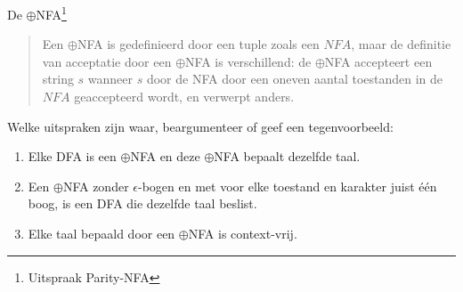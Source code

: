 \documentclass{article}
\begin{document}
\begin{question}[] De $\oplus$NFA\footnote{Uitspraak Parity-NFA}
\vspace{-0.5cm}
\begin{quote}
\begin{definition}
Een $\oplus$NFA is gedefinieerd door een tuple zoals een $NFA$, maar de
definitie van acceptatie door een $\oplus$NFA is verschillend: de
$\oplus$NFA accepteert een string $s$ wanneer $s$ door de NFA door een
oneven aantal toestanden in de $NFA$ geaccepteerd wordt, en verwerpt
anders.
\end{definition}
\end{quote}
Welke uitspraken zijn waar, beargumenteer of geef een tegenvoorbeeld:
\begin{enumerate}
\item
Elke DFA is een $\oplus$NFA en deze $\oplus$NFA bepaalt dezelfde taal.

\item
Een $\oplus$NFA zonder $\epsilon$-bogen en met voor elke toestand en
karakter juist \'{e}\'{e}n boog, is een DFA die dezelfde taal beslist.

\item
Elke taal bepaald door een $\oplus$NFA is context-vrij.


\end{enumerate}
\end{question}
\end{document}
